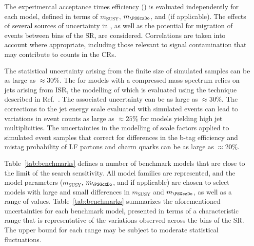 The experimental acceptance times efficiency (\ate) is evaluated
independently for each model, defined in terms of $m_\text{SUSY}$,
$m_{\PSGczDo}$, and \ctau (if applicable). 
The effects of several sources of uncertainty in \ate, as well as the
potential for migration of events between bins of the SR, are
considered. Correlations are taken into account where appropriate,
including those relevant to signal contamination that may contribute
to counts in the CRs. 

The statistical uncertainty arising from the finite size of simulated
samples can be as large as ${\approx}30\%$. The \ate for models with a
compressed mass spectrum relies on jets arising from ISR, the
modelling of which is evaluated 
using the technique described in Ref.~\cite{Chatrchyan:2013xna}. The
associated uncertainty can be as large as ${\approx}30\%$.
The corrections to the jet energy scale evaluated with simulated
events can lead to variations in event counts as large as
${\approx}25\%$ for models yielding high jet multiplicities. 
The uncertainties in the modelling of scale factors applied to
simulated event samples that correct for differences in the b-tag
efficiency
and mistag probability of LF partons and charm quarks
can be as large as ${\approx}20\%$.

Table~\ref{tab:benchmarks} defines a number of benchmark models that
are close to the limit of the search sensitivity. %
All model families %
are represented, and the model parameters ($m_\text{SUSY}$,
$m_{\PSGczDo}$, and \ctau if applicable) are chosen to select models
with large and small differences in $m_\text{SUSY}$ and
$m_{\PSGczDo}$, as well as a range of \ctau values. 
Table~\ref{tab:benchmarks} summarizes the aforementioned uncertainties
for each benchmark model, presented in terms of a characteristic range
that is representative of the variations observed across the bins of
the SR. The upper bound for each range may be subject to moderate
statistical fluctuations.

